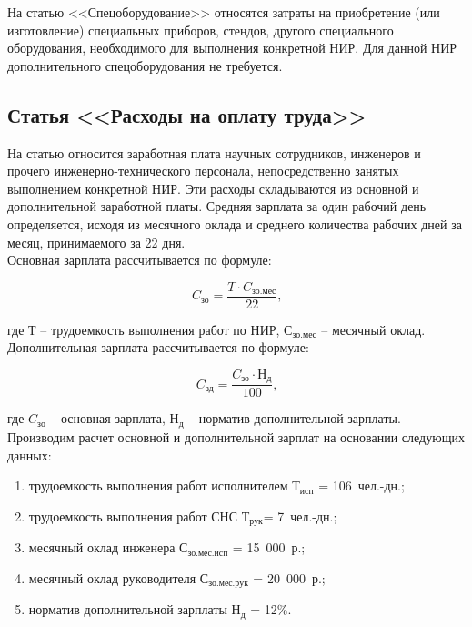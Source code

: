 На статью <<Спецоборудование>> относятся затраты на приобретение (или изготовление) специальных приборов,
стендов, другого специального оборудования, необходимого для выполнения конкретной НИР.
Для данной НИР дополнительного спецоборудования не требуется.

\subsection{Статья <<Расходы на оплату труда>>}

На статью относится заработная плата научных сотрудников, инженеров и прочего инженерно-технического персонала,
непосредственно занятых выполнением конкретной НИР. Эти расходы складываются из основной и дополнительной
заработной платы. Средняя зарплата за один рабочий день определяется, исходя из месячного оклада и среднего
количества рабочих дней за месяц, принимаемого за 22 дня.\\
Основная зарплата рассчитывается по формуле:

\begin{equation}
C_{зо} = \frac{T \cdot C_{зо.мес}}{22}\mbox{,}
\label{F:F1}
\end{equation}

где Т – трудоемкость выполнения работ по НИР, $С_{зо.мес}$ – месячный оклад.\\
Дополнительная зарплата рассчитывается по формуле:

\begin{equation}
C_{зд} = \frac{C_{зо} \cdot Н_{д}}{100}\mbox{,}
\label{F:F2}
\end{equation}

где $C_{зо}$ – основная зарплата, $Н_{д}$ – норматив дополнительной зарплаты.\\
Производим расчет основной и дополнительной зарплат на основании следующих данных:

\begin{enumerate}
\item трудоемкость выполнения работ исполнителем $Т_{исп}$ = 106~чел.-дн.;
\item трудоемкость выполнения работ СНС $Т_{рук}$= 7~чел.-дн.;
\item месячный оклад инженера $С_{зо.мес.исп}$ = 15~000~р.;
\item месячный оклад руководителя $С_{зо.мес.рук}$ = 20~000~р.;
\item норматив дополнительной зарплаты $Н_{д}$ = 12\%.
\end{enumerate}

